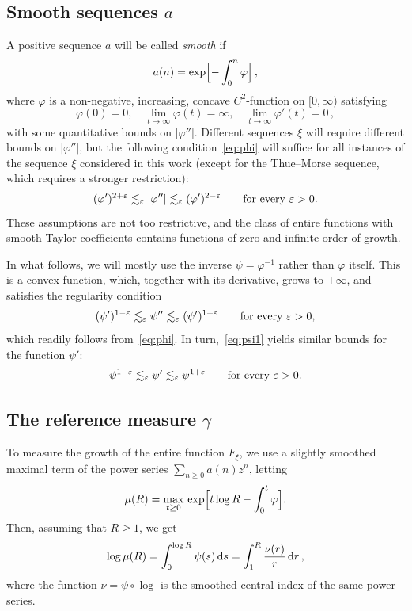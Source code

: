 \documentclass[11pt]{amsart}
\numberwithin{equation}{section}
\def\ep{{\varepsilon}}
\begin{document}
\subsection{Smooth sequences $a$}
A positive sequence $a$ will be called {\em smooth} if
\begin{equation}\label{eq:a_n}
a(n) = \exp\Bigl[ -\int_0^n \varphi \Bigr]\,,
\end{equation}
where $\varphi$ is a non-negative, increasing, concave $C^2$-function on $[0, \infty)$
satisfying
\[
\varphi (0) = 0, \quad \lim_{t\to\infty} \varphi (t) = \infty, \quad \lim_{t\to\infty} \varphi' (t)= 0\,,
\]
with some quantitative bounds on $|\varphi''|$.
Different sequences $\xi$ will require different bounds on $|\varphi''|$, but
the following condition~\eqref{eq:phi} will suffice for all instances of the sequence
$\xi$ considered in this work (except for the Thue--Morse sequence,
which requires a stronger restriction):
\begin{equation}\label{eq:phi}
(\varphi')^{2+\ep} \lesssim_\ep |\varphi''|
\lesssim_\ep (\varphi')^{2-\ep}
\qquad {\rm for\ every\ } \ep>0.
\end{equation}
These assumptions are not too restrictive, and the class
of entire functions with smooth Taylor coefficients contains functions of zero and infinite order of
growth.

In what follows, we will mostly use the  inverse $\psi=\varphi^{-1}$ rather than $\varphi$ itself.
This is a convex function, which, together with its derivative, grows to $+\infty$, and satisfies the
regularity condition
\begin{equation}\label{eq:psi1}
(\psi')^{1-\ep} \lesssim_\ep \psi''
\lesssim_\ep (\psi')^{1+\ep}
\qquad {\rm for\ every\ } \ep>0,
\end{equation}
which readily follows from~\eqref{eq:phi}. In turn,~\eqref{eq:psi1} yields similar bounds for the
function $\psi'$:
\begin{equation}\label{eq:psi2}
\psi^{1-\ep} \lesssim_\ep \psi'
\lesssim_\ep \psi^{1+\ep}
\qquad {\rm for\ every\ } \ep>0.
\end{equation}


\subsection{The reference measure $\gamma$}
To measure the growth of the entire function $F_\xi$, we use a slightly smoothed maximal term
of the power series $\sum_{n\ge 0} a(n) z^n$, letting
\[
\mu (R) =\max_{t\ge 0}\, \exp\Bigl[ t\log R - \int_0^t \varphi\Bigr].
\]
Then, assuming that $R\ge 1$, we get
\[
\log \mu (R) =\int_0^{\log R} \psi (s)\, {\rm d}s  = \int_1^R \frac{\nu(r)}{r}\, {\rm d}r\,,
\]
where the function $\nu =\psi \circ \log $ is the smoothed central index of the same power series.
\end{document}
